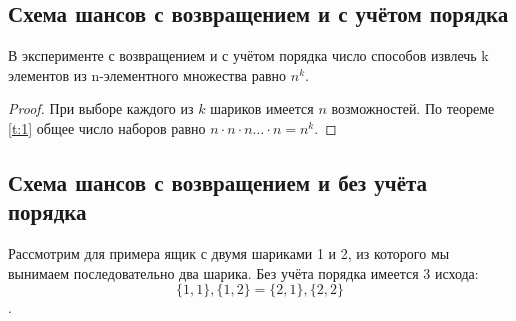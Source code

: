 \subsection{Схема шансов с возвращением и с учётом порядка}
\begin{theorem}
В эксперименте с возвращением и с учётом порядка число
способов извлечь k элементов из n-элементного множества равно $n^k$.
\end{theorem}
\begin{proof}
При выборе каждого из $k$ шариков имеется $n$ возможностей. 
По теореме \ref{t:1} общее число наборов равно $n\cdot n\cdot n\dots\cdot n=n^k$.
\end{proof}
\subsection{Схема шансов с возвращением и без учёта порядка}
\begin{remark}
\label{remark:1}
Рассмотрим для примера ящик с двумя шариками 1 и 2,
из которого мы вынимаем последовательно два шарика. Без учёта порядка
имеется 3 исхода: 
$$\{1,1\}, \{1,2\} = \{2,1\}, \{2, 2\}$$.
\end{remark}

